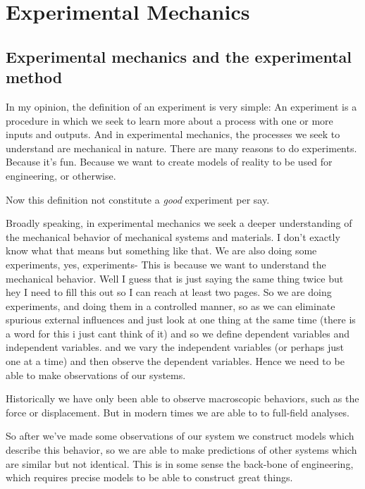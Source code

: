 \chapter{Experimental Mechanics}

\section{Experimental mechanics and the experimental method}
In my opinion, the definition of an experiment is very simple: An experiment is a procedure in which we seek to learn more about a process with one or more inputs and outputs. And in experimental mechanics, the processes we seek to understand are mechanical in nature. There are many reasons to do experiments. Because it's fun. Because we want to create models of reality to be used for engineering, or otherwise.
 
Now this definition not constitute a \textit{good} experiment per say. 

Broadly speaking, in experimental mechanics we seek a deeper understanding of the mechanical behavior of mechanical systems and materials. I don't exactly know what that means but something like that. We are also doing some experiments, yes, experiments- This is because we want to understand the mechanical behavior. Well I guess that is just saying the same thing twice but hey I need to fill this out so I can reach at least two pages. So we are doing experiments, and doing them in a controlled manner, so as we can eliminate spurious external influences and just look at one thing at the same time (there is a word for this i just cant think of it) and so we define dependent variables and independent variables. and we vary the independent variables (or perhaps just one at a time) and then observe the dependent variables. Hence we need to be able to make observations of our systems.


Historically we have only been able to observe macroscopic behaviors, such as the force or displacement. But in modern times we are able to to full-field analyses.

So after we've made some observations of our system we construct models which describe this behavior, so we are able to make predictions of other systems which are similar but not identical. This is in some sense the back-bone of engineering, which requires precise models to be able to construct great things.

